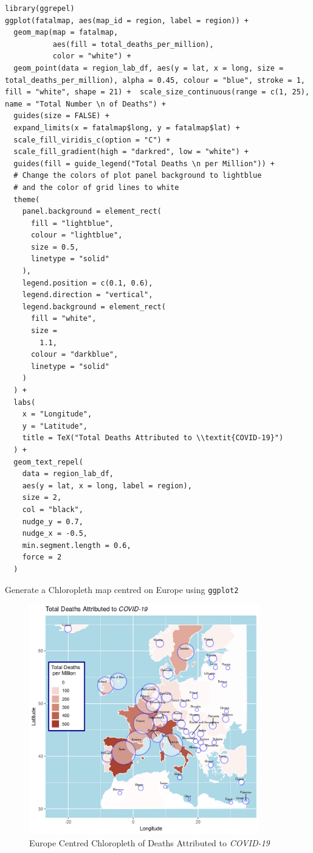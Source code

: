 \documentclass[11pt]{article}
\begin{document}
\begin{listing}[htbp]
\begin{verbatim}
library(ggrepel)
ggplot(fatalmap, aes(map_id = region, label = region)) +
  geom_map(map = fatalmap,
           aes(fill = total_deaths_per_million),
           color = "white") +
  geom_point(data = region_lab_df, aes(y = lat, x = long, size = total_deaths_per_million), alpha = 0.45, colour = "blue", stroke = 1, fill = "white", shape = 21) +  scale_size_continuous(range = c(1, 25), name = "Total Number \n of Deaths") +
  guides(size = FALSE) +
  expand_limits(x = fatalmap$long, y = fatalmap$lat) +
  scale_fill_viridis_c(option = "C") +
  scale_fill_gradient(high = "darkred", low = "white") +
  guides(fill = guide_legend("Total Deaths \n per Million")) +
  # Change the colors of plot panel background to lightblue
  # and the color of grid lines to white
  theme(
    panel.background = element_rect(
      fill = "lightblue",
      colour = "lightblue",
      size = 0.5,
      linetype = "solid"
    ),
    legend.position = c(0.1, 0.6),
    legend.direction = "vertical",
    legend.background = element_rect(
      fill = "white",
      size =
        1.1,
      colour = "darkblue",
      linetype = "solid"
    )
  ) +
  labs(
    x = "Longitude",
    y = "Latitude",
    title = TeX("Total Deaths Attributed to \\textit{COVID-19}")
  ) +
  geom_text_repel(
    data = region_lab_df,
    aes(y = lat, x = long, label = region),
    size = 2,
    col = "black",
    nudge_y = 0.7,
    nudge_x = -0.5,
    min.segment.length = 0.6,
    force = 2
  )
\end{verbatim}
\caption{\label{org72a9cb4}Generate a Chloropleth map centred on Europe using \texttt{ggplot2}}
\end{listing}


\begin{figure}[htbp]
\centering
\includegraphics[width=10cm]{SecChEur.png}
\caption{\label{fig:org2f71c00}Europe Centred Chloropleth of Deaths Attributed to \emph{COVID-19}}
\end{figure}
\end{document}
